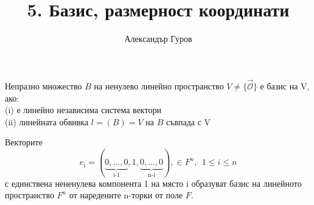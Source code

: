 \documentclass{article}
\title{5. Базис, размерност координати}
\author{Александър Гуров}
\date{\datebulgarian{\today}}
\begin{document}
\maketitle
\begin{tcolorbox}[title = Определение 5.1, colframe = red!70!black, colback = red!10!white]
    Непразно множество $B$ на ненулево линейно пространство $V \neq \{\vec{\mathcal{O}} \}$ е
    базис на V, ако:\\
    (i) е линейно независима система вектори\\
    (ii) линейната обвивка $l=(B)=V$ на $B$ съвпада с V
\end{tcolorbox}
\begin{tcolorbox}[title = Пример 5.2, colframe = green!70!black, colback = green!10!white]
    Векторите
    \[
        e_i=(\underbrace{0,...,0}_\text{i-1},1,\underbrace{0,...,0}_\text{n-i}), \in F^n, \ \ 1\leq i\leq n
    \]
    с единствена нененулева компонента 1 на място i образуват базис на линейното пространство
    $F^n$ от наредените n-торки от поле $F$.
\end{tcolorbox}
\end{document}
